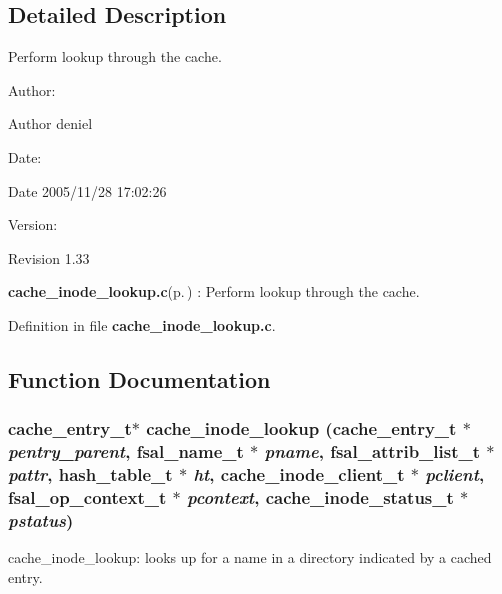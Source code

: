 \subsection{Detailed Description}
Perform lookup through the cache. 

\begin{Desc}
\item[Author:]\begin{Desc}
\item[Author]deniel \end{Desc}
\end{Desc}
\begin{Desc}
\item[Date:]\begin{Desc}
\item[Date]2005/11/28 17:02:26 \end{Desc}
\end{Desc}
\begin{Desc}
\item[Version:]\begin{Desc}
\item[Revision]1.33 \end{Desc}
\end{Desc}
{\bf cache\_\-inode\_\-lookup.c}{\rm (p.\,\pageref{cache__inode__lookup_8c})} : Perform lookup through the cache.

Definition in file {\bf cache\_\-inode\_\-lookup.c}.

\subsection{Function Documentation}
\subsubsection{\setlength{\rightskip}{0pt plus 5cm}cache\_\-entry\_\-t$\ast$ cache\_\-inode\_\-lookup (cache\_\-entry\_\-t $\ast$ {\em pentry\_\-parent}, fsal\_\-name\_\-t $\ast$ {\em pname}, fsal\_\-attrib\_\-list\_\-t $\ast$ {\em pattr}, hash\_\-table\_\-t $\ast$ {\em ht}, cache\_\-inode\_\-client\_\-t $\ast$ {\em pclient}, fsal\_\-op\_\-context\_\-t $\ast$ {\em pcontext}, cache\_\-inode\_\-status\_\-t $\ast$ {\em pstatus})}\label{cache__inode__lookup_8c_a2}


cache\_\-inode\_\-lookup: looks up for a name in a directory indicated by a cached entry.

